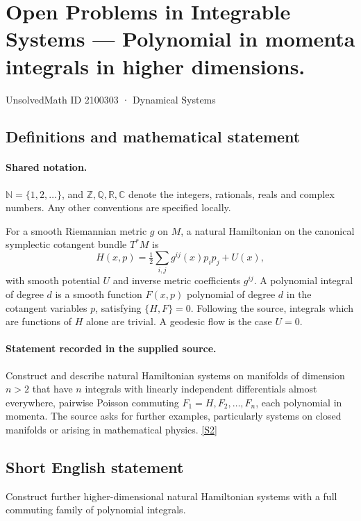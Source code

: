\documentclass[11pt]{article}
\newcommand{\sref}[2]{\hyperlink{source:#1:#2}{[S#2]}}
\begin{document}
\setcounter{section}{2100302}
\section{Open Problems in Integrable Systems — Polynomial in momenta integrals in higher dimensions.}\label{2100303}
{\small\sffamily UnsolvedMath ID 2100303 · Dynamical Systems}
\subsection{Definitions and mathematical statement}

\paragraph{Shared notation.}$\mathbb N=\{1,2,\ldots\}$, and $\mathbb Z,\mathbb Q,\mathbb R,\mathbb C$ denote the integers, rationals, reals and complex numbers. Any other conventions are specified locally.


For a smooth Riemannian metric $g$ on $M$, a natural Hamiltonian on the canonical symplectic cotangent bundle $T^*M$ is \[H(x,p)=\tfrac12\sum_{i,j}g^{ij}(x)p_ip_j+U(x),\] with smooth potential $U$ and inverse metric coefficients $g^{ij}$. A polynomial integral of degree $d$ is a smooth function $F(x,p)$ polynomial of degree $d$ in the cotangent variables $p$, satisfying $\{H,F\}=0$. Following the source, integrals which are functions of $H$ alone are trivial. A geodesic flow is the case $U=0$.
\paragraph{Statement recorded in the supplied source.}
Construct and describe natural Hamiltonian systems on manifolds of dimension $n>2$ that have $n$ integrals with linearly independent differentials almost everywhere, pairwise Poisson commuting $F_1=H,F_2,\ldots,F_n$, each polynomial in momenta. The source asks for further examples, particularly systems on closed manifolds or arising in mathematical physics. \sref{2100303}{2}
\subsection{Short English statement}
Construct further higher-dimensional natural Hamiltonian systems with a full commuting family of polynomial integrals.
\end{document}

